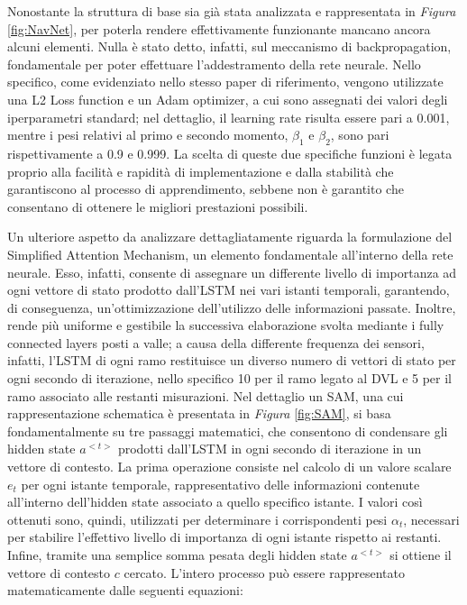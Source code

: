 Nonostante la struttura di base sia già stata analizzata e rappresentata in \emph{Figura} \ref{fig:NavNet}, per poterla rendere effettivamente funzionante mancano ancora alcuni elementi. Nulla è stato detto, infatti, sul meccanismo di backpropagation, fondamentale per poter effettuare l'addestramento della rete neurale. Nello specifico, come evidenziato nello stesso paper di riferimento, vengono utilizzate una L2 Loss function e un Adam optimizer, a cui sono assegnati dei valori degli iperparametri standard; nel dettaglio, il learning rate risulta essere pari a 0.001, mentre i pesi relativi al primo e secondo momento, $\beta_{1}$ e $\beta_{2}$, sono pari rispettivamente a 0.9 e 0.999. La scelta di queste due specifiche funzioni è legata proprio alla facilità e rapidità di implementazione e dalla stabilità che garantiscono al processo di apprendimento, sebbene non è garantito che consentano di ottenere le migliori prestazioni possibili. 

Un ulteriore aspetto da analizzare dettagliatamente riguarda la formulazione del Simplified Attention Mechanism, un elemento fondamentale all'interno della rete neurale. Esso, infatti, consente di assegnare un differente livello di importanza ad ogni vettore di stato prodotto dall'LSTM nei vari istanti temporali, garantendo, di conseguenza, un'ottimizzazione dell'utilizzo delle informazioni passate. Inoltre, rende più uniforme e gestibile la successiva elaborazione svolta mediante i fully connected layers posti a valle; a causa della differente frequenza dei sensori, infatti, l'LSTM di ogni ramo restituisce un diverso numero di vettori di stato per ogni secondo di iterazione, nello specifico 10 per il ramo legato al DVL e 5 per il ramo associato alle restanti misurazioni. Nel dettaglio un SAM, una cui rappresentazione schematica è presentata in \emph{Figura} \ref{fig:SAM}, si basa fondamentalmente su tre passaggi matematici, che consentono di condensare gli hidden state $a^{<t>}$ prodotti dall'LSTM in ogni secondo di iterazione in un vettore di contesto. La prima operazione consiste nel calcolo di un valore scalare $e_{t}$ per ogni istante temporale, rappresentativo delle informazioni contenute all'interno dell'hidden state associato a quello specifico istante. I valori così ottenuti sono, quindi, utilizzati per determinare i corrispondenti pesi $\alpha_{t}$, necessari per stabilire l'effettivo livello di importanza di ogni istante rispetto ai restanti. Infine, tramite una semplice somma pesata degli hidden state $a^{<t>}$ si ottiene il vettore di contesto $c$ cercato. L'intero processo può essere rappresentato matematicamente dalle seguenti equazioni: 

